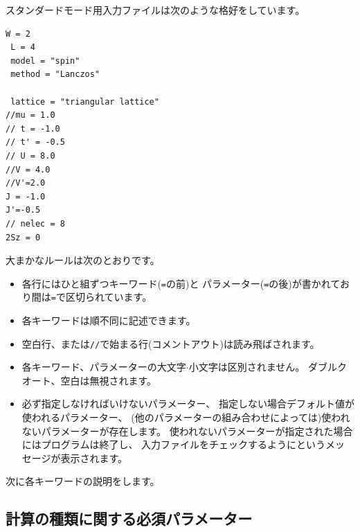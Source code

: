 
スタンダードモード用入力ファイルは次のような格好をしています。

\begin{minipage}{10cm}
\begin{screen}
\begin{verbatim}
W = 2
 L = 4
 model = "spin"
 method = "Lanczos"

 lattice = "triangular lattice"
//mu = 1.0
// t = -1.0
// t' = -0.5
// U = 8.0
//V = 4.0
//V'=2.0
J = -1.0
J'=-0.5
// nelec = 8
2Sz = 0
\end{verbatim}
\end{screen}
\end{minipage}

大まかなルールは次のとおりです。
\begin{itemize}
\item 各行にはひと組ずつキーワード(\verb|=|の前)と
  パラメーター(\verb|=|の後)が書かれており間は\verb|=|で区切られています。
\item 各キーワードは順不同に記述できます。
\item 空白行、または\verb|//|で始まる行(コメントアウト)は読み飛ばされます。
\item 各キーワード、パラメーターの大文字$\cdot$小文字は区別されません。
  ダブルクオート、空白は無視されます。
\item 必ず指定しなければいけないパラメーター、
  指定しない場合デフォルト値が使われるパラメーター、
  (他のパラメーターの組み合わせによっては)使われないパラメーターが存在します。
  使われないパラメーターが指定された場合にはプログラムは終了し、
  入力ファイルをチェックするようにというメッセージが表示されます。
\end{itemize}

次に各キーワードの説明をします。

\subsection{計算の種類に関する必須パラメーター}


